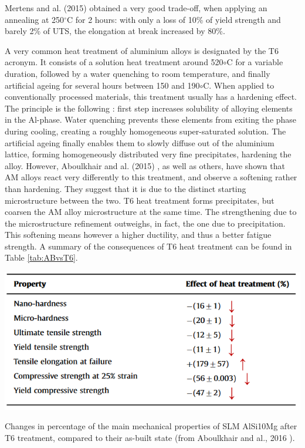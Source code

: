 Mertens and al. (2015)\cite{Mertens15} obtained a very good trade-off, when applying an annealing at 250$^\circ$C for 2 hours: with only a loss of 10\% of yield strength and barely 2\% of UTS, the elongation at break increased by 80\%.

A very common heat treatment of aluminium alloys is designated by the T6 acronym. It consists of a solution heat treatment around 520$\circ$C for a variable duration, followed by a water quenching to room temperature, and finally artificial ageing for several hours between 150 and 190$\circ$C. When applied to conventionally processed materials, this treatment usually has a hardening effect. The principle is the following \cite{T6}: first step increases solubility of alloying elements in the Al-phase. Water quenching prevents these elements from exiting the phase during cooling, creating a roughly homogeneous super-saturated solution. The artificial ageing finally enables them to slowly diffuse out of the aluminium lattice, forming homogeneously distributed very fine precipitates, hardening the alloy. However, Aboulkhair and al. (2015) \cite{aboulkhair2015}, as well as others, have shown that AM alloys react very differently to this treatment, and observe a softening rather than hardening. They suggest that it is due to the distinct starting microstructure between the two. T6 heat treatment forms precipitates, but coarsen the AM alloy microstructure at the same time. The strengthening due to the microstructure refinement outweighs, in fact, the one due to precipitation. This softening means however a higher ductility, and thus a better fatigue strength. A summary of the consequences of T6 heat treatment can be found in Table \ref{tab:ABvsT6}. \\

\begin{table}[ht]
		\centering
			\includegraphics[scale=0.70]{Images/ABvsT6}
			\decoRule
		\caption[Changes in percentage of the main mechanical properties of SLM AlSi10Mg after T6 treatment, , compared to their as-built state] {Changes in percentage of the main mechanical properties of SLM AlSi10Mg after T6 treatment, compared to their as-built state (from Aboulkhair and al., 2016 \parencite{ABOULKHAIR2016139}).}
		\label{tab:ABvsT6}
\end{table}

